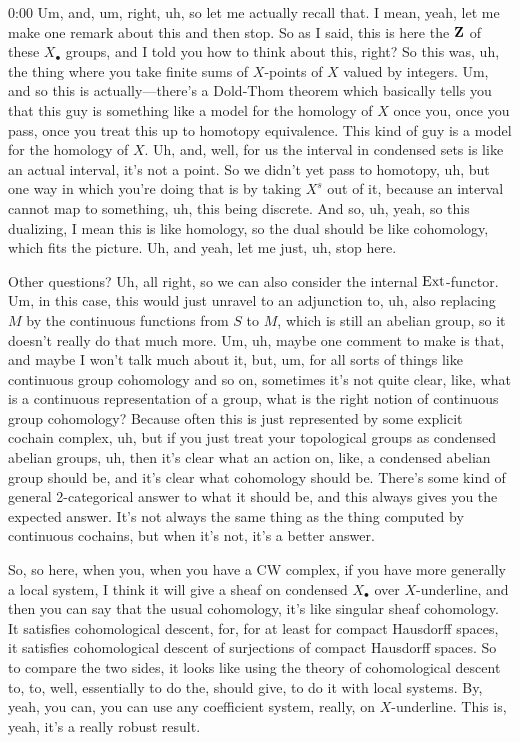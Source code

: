 \begin{unfinished}{0:00}
Um, and, um, right, uh, so let me actually recall that. I mean, yeah, let me make one remark about this and then stop. So as I said, this is here the $\mathbf Z$ of these $X_\bullet$ groups, and I told you how to think about this, right? So this was, uh, the thing where you take finite sums of $X$-points of $X$ valued by integers. Um, and so this is actually---there's a Dold-Thom theorem which basically tells you that this guy is something like a model for the homology of $X$ once you, once you pass, once you treat this up to homotopy equivalence. This kind of guy is a model for the homology of $X$. Uh, and, well, for us the interval in condensed sets is like an actual interval, it's not a point. So we didn't yet pass to homotopy, uh, but one way in which you're doing that is by taking $X^s$ out of it, because an interval cannot map to something, uh, this being discrete. And so, uh, yeah, so this dualizing, I mean this is like homology, so the dual should be like cohomology, which fits the picture. Uh, and yeah, let me just, uh, stop here.

Other questions? Uh, all right, so we can also consider the internal $\operatorname{Ext}$-functor. Um, in this case, this would just unravel to an adjunction to, uh, also replacing $M$ by the continuous functions from $S$ to $M$, which is still an abelian group, so it doesn't really do that much more. Um, uh, maybe one comment to make is that, and maybe I won't talk much about it, but, um, for all sorts of things like continuous group cohomology and so on, sometimes it's not quite clear, like, what is a continuous representation of a group, what is the right notion of continuous group cohomology? Because often this is just represented by some explicit cochain complex, uh, but if you just treat your topological groups as condensed abelian groups, uh, then it's clear what an action on, like, a condensed abelian group should be, and it's clear what cohomology should be. There's some kind of general 2-categorical answer to what it should be, and this always gives you the expected answer. It's not always the same thing as the thing computed by continuous cochains, but when it's not, it's a better answer.

So, so here, when you, when you have a CW complex, if you have more generally a local system, I think it will give a sheaf on condensed $X_\bullet$ over $X$-underline, and then you can say that the usual cohomology, it's like singular sheaf cohomology. It satisfies cohomological descent, for, for at least for compact Hausdorff spaces, it satisfies cohomological descent of surjections of compact Hausdorff spaces. So to compare the two sides, it looks like using the theory of cohomological descent to, to, well, essentially to do the, should give, to do it with local systems. By, yeah, you can, you can use any coefficient system, really, on $X$-underline. This is, yeah, it's a really robust result.


\end{unfinished}
